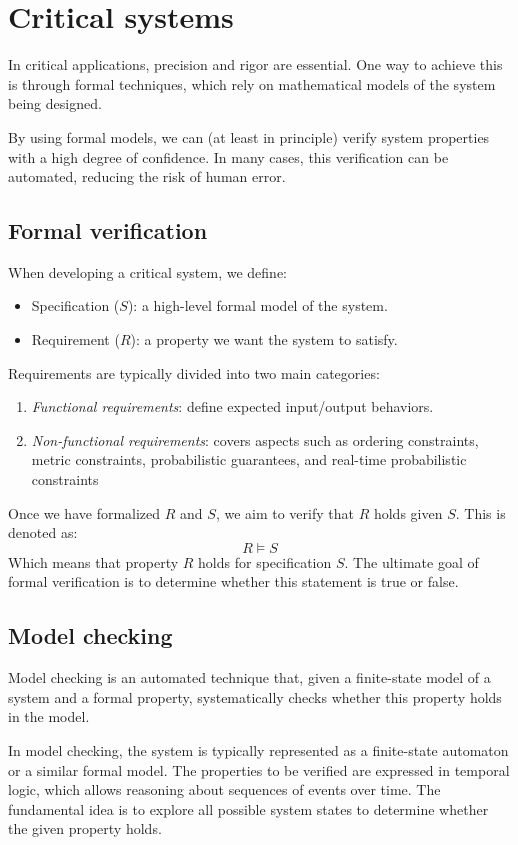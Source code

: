 \section{Critical systems}

In critical applications, precision and rigor are essential. 
One way to achieve this is through formal techniques, which rely on mathematical models of the system being designed.

By using formal models, we can (at least in principle) verify system properties with a high degree of confidence. 
In many cases, this verification can be automated, reducing the risk of human error.

\subsection{Formal verification}
When developing a critical system, we define:
\begin{itemize}
    \item Specification ($S$): a high-level formal model of the system.
    \item Requirement ($R$): a property we want the system to satisfy.
\end{itemize}
\noindent Requirements are typically divided into two main categories:
\begin{enumerate}
    \item \textit{Functional requirements}: define expected input/output behaviors.
    \item \textit{Non-functional requirements}: covers aspects such as ordering constraints, metric constraints, probabilistic guarantees, and real-time probabilistic constraints
\end{enumerate}
\noindent Once we have formalized $R$ and $S$, we aim to verify that $R$ holds given $S$. 
This is denoted as: 
\[R\models S\]
Which means that property $R$ holds for specification $S$. 
The ultimate goal of formal verification is to determine whether this statement is true or false.

\subsection{Model checking}
\begin{definition}
    Model checking is an automated technique that, given a finite-state model of a system and a formal property, systematically checks whether this property holds in the model.
\end{definition}
In model checking, the system is typically represented as a finite-state automaton or a similar formal model. 
The properties to be verified are expressed in temporal logic, which allows reasoning about sequences of events over time. 
The fundamental idea is to explore all possible system states to determine whether the given property holds.

